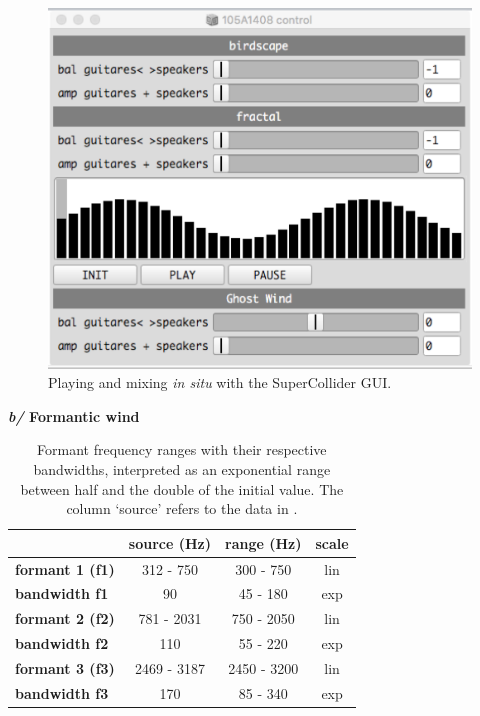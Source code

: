\begin{figure}[h!]
\begin{center}
	\includegraphics[scale=0.45]{img/9809}		
\caption{Playing and mixing \textit{in situ} with the SuperCollider GUI.}
\label{hk}
\end{center}
\end{figure}

  \textbf{\textit{b/} Formantic wind}
  
  \smallskip 
  
  \begin{table}[H]
\begin{center}
{\ttfamily
\begin{tabular}{|l|c|c|c|}
\cline{2-4}
    \multicolumn{1}{c|}{} & \textbf{source (Hz)} & \textbf{range (Hz)} & \textbf{scale} \\ 
    \hline 
    \textbf{formant 1 (f1)} & 312 - 750 & 300 - 750 & lin \\ 
 \hline
 \textbf{bandwidth f1} & 90 & 45 - 180 & exp \\ 
 \hline
 \textbf{formant 2 (f2)} & 781 - 2031 & 750 - 2050 & lin \\ 
 \hline
 \textbf{bandwidth f2} & 110 & 55 - 220 & exp \\ 
 \hline
 \textbf{formant 3 (f3)} & 2469 - 3187 & 2450 - 3200 & lin \\ 
 \hline
 \textbf{bandwidth f3} & 170 & 85 - 340 & exp \\ 
 \hline
\end{tabular}}
\caption{Formant frequency ranges with their respective bandwidths, interpreted as an exponential range between half and the double of the initial value. The column `source' refers to the data in \citep{adc}.}
\end{center}
\label{default}
\end{table}%

	
	
	
	
